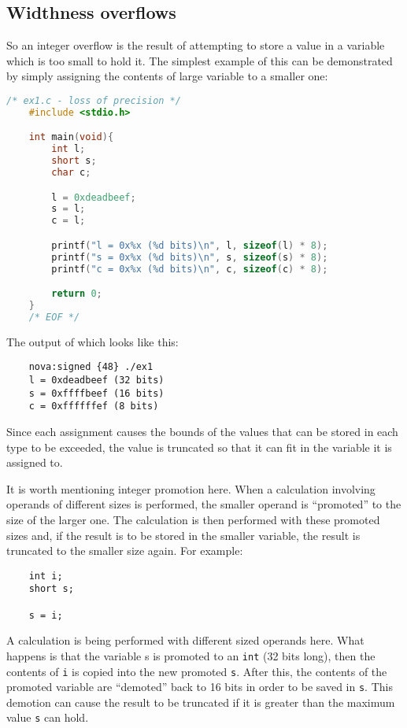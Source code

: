 \documentclass{iacrtrans}
\begin{document}
\subsection{Widthness overflows}

So an integer overflow is the result of attempting to store a value in a
variable which is too small to hold it.  The simplest example of this can
be demonstrated by simply assigning the contents of large variable to a
smaller one:

\begin{lstlisting}[language=c]
    /* ex1.c - loss of precision */
    #include <stdio.h>

    int main(void){
        int l;
        short s;
        char c;

        l = 0xdeadbeef;
        s = l;
        c = l;

        printf("l = 0x%x (%d bits)\n", l, sizeof(l) * 8);
        printf("s = 0x%x (%d bits)\n", s, sizeof(s) * 8);
        printf("c = 0x%x (%d bits)\n", c, sizeof(c) * 8);

        return 0;
    }
    /* EOF */
\end{lstlisting}

The output of which looks like this:

\begin{verbatim}
    nova:signed {48} ./ex1
    l = 0xdeadbeef (32 bits)
    s = 0xffffbeef (16 bits)
    c = 0xffffffef (8 bits)
\end{verbatim}

Since each assignment causes the bounds of the values that can be stored in
each type to be exceeded, the value is truncated so that it can fit in the
variable it is assigned to.

It is worth mentioning integer promotion here.  When a calculation
involving operands of different sizes is performed, the smaller operand is
``promoted'' to the size of the larger one.  The calculation is then
performed with these promoted sizes and, if the result is to be stored in
the smaller variable, the result is truncated to the smaller size again.
For example:

\begin{verbatim}
    int i;
    short s;

    s = i;
\end{verbatim}

A calculation is being performed with different sized operands here.  What
happens is that the variable s is promoted to an \texttt{int} (32 bits long), then
the contents of \texttt{i} is copied into the new promoted \texttt{s}.  After this, the
contents of the promoted variable are ``demoted'' back to 16 bits in order to
be saved in \texttt{s}.  This demotion can cause the result to be truncated if it is
greater than the maximum value \texttt{s} can hold.
\end{document}
